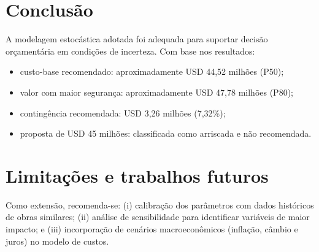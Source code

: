 \documentclass[12pt,a4paper]{article}
\begin{document}
\section{Conclus\~ao}
A modelagem estoc\'astica adotada foi adequada para suportar decis\~ao or\c{c}ament\'aria em condi\c{c}\~oes de incerteza. Com base nos resultados:
\begin{itemize}
  \item custo-base recomendado: aproximadamente USD 44,52 milh\~oes (P50);
  \item valor com maior seguran\c{c}a: aproximadamente USD 47,78 milh\~oes (P80);
  \item conting\^encia recomendada: USD 3,26 milh\~oes (7,32\%);
  \item proposta de USD 45 milh\~oes: classificada como arriscada e n\~ao recomendada.
\end{itemize}

\section{Limita\c{c}\~oes e trabalhos futuros}
Como extens\~ao, recomenda-se: (i) calibra\c{c}\~ao dos par\^ametros com dados hist\'oricos de obras similares; (ii) an\'alise de sensibilidade para identificar vari\'aveis de maior impacto; e (iii) incorpora\c{c}\~ao de cen\'arios macroecon\^omicos (infla\c{c}\~ao, c\^ambio e juros) no modelo de custos.
\end{document}
